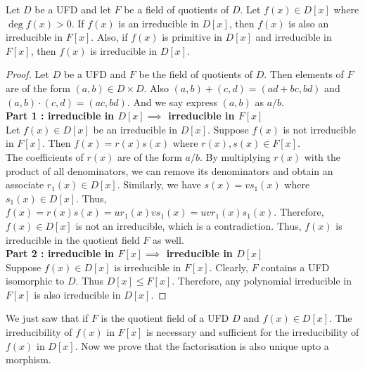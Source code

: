 \begin{lemma}
	Let $D$ be a UFD and let $F$ be a field of quotients of $D$.
	Let $f(x) \in D[x]$ where $\deg f(x) > 0$.
	If $f(x)$ is an irreducible in $D[x]$, then $f(x)$ is also an irreducible in $F[x]$.
	Also, if $f(x)$ is primitive in $D[x]$ and irreducible in $F[x]$, then $f(x)$ is irreducible in $D[x]$.
\end{lemma}
\begin{proof}
	Let $D$ be a UFD and $F$ be the field of quotients of $D$.
	Then elements of $F$ are of the form $(a,b) \in D \times D$.
	Also $(a,b)+(c,d)  = (ad+bc,bd)$ and $(a,b)\cdot (c,d) = (ac,bd)$.
	And we say express $(a,b)$ as $a/b$.\\

	\textbf{Part 1 : irreducible in $D[x] \implies$ irreducible in $F[x]$}\\
	Let $f(x) \in D[x]$ be an irreducible in $D[x]$.
	Suppose $f(x)$ is not irreducible in $F[x]$.
	Then $f(x) = r(x)s(x)$ where $r(x),s(x) \in F[x]$.\\

	The coefficients of $r(x)$ are of the form $a/b$.
	By multiplying $r(x)$ with the product of all denominators, we can remove its denominators and obtain an associate $r_1(x) \in D[x]$.
	Similarly, we have $s(x) = vs_1(x)$ where $s_1(x) \in D[x]$.
	Thus, $f(x) = r(x)s(x) = ur_1(x)vs_1(x) = uv r_1(x)s_1(x)$.
	Therefore, $f(x) \in D[x]$ is not an irreducible, which is a contradiction.
	Thus, $f(x)$ is irreducible in the quotient field $F$ as well.\\

	\textbf{Part 2 : irreducible in $F[x] \implies$ irreducible in $D[x]$}\\
	Suppose $f(x) \in D[x]$ is irreducible in $F[x]$.	
	Clearly, $F$ contains a UFD isomorphic to $D$.
	Thus $D[x] \le F[x]$.
	Therefore, any polynomial irreducible in $F[x]$ is also irreducible in $D[x]$.
\end{proof}
	We just saw that if $F$ is the quotient field of a UFD $D$ and $f(x) \in D[x]$. The irreducibility of $f(x)$ in $F[x]$ is necessary and sufficient for the irreducibility of $f(x)$ in $D[x]$. Now we prove that the factorisation is also unique upto a morphism.

